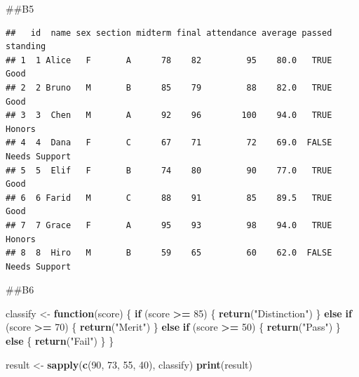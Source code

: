 \documentclass[
]{article}
\newenvironment{Shaded}{\begin{snugshade}}{\end{snugshade}}
\newcommand{\ControlFlowTok}[1]{\textcolor[rgb]{0.13,0.29,0.53}{\textbf{#1}}}
\newcommand{\DecValTok}[1]{\textcolor[rgb]{0.00,0.00,0.81}{#1}}
\newcommand{\FunctionTok}[1]{\textcolor[rgb]{0.13,0.29,0.53}{\textbf{#1}}}
\newcommand{\NormalTok}[1]{#1}
\newcommand{\OtherTok}[1]{\textcolor[rgb]{0.56,0.35,0.01}{#1}}
\newcommand{\SpecialCharTok}[1]{\textcolor[rgb]{0.81,0.36,0.00}{\textbf{#1}}}
\newcommand{\StringTok}[1]{\textcolor[rgb]{0.31,0.60,0.02}{#1}}
\begin{document}
\#\#B5

\begin{Shaded}
\end{Shaded}

\begin{verbatim}
##   id  name sex section midterm final attendance average passed      standing
## 1  1 Alice   F       A      78    82         95    80.0   TRUE          Good
## 2  2 Bruno   M       B      85    79         88    82.0   TRUE          Good
## 3  3  Chen   M       A      92    96        100    94.0   TRUE        Honors
## 4  4  Dana   F       C      67    71         72    69.0  FALSE Needs Support
## 5  5  Elif   F       B      74    80         90    77.0   TRUE          Good
## 6  6 Farid   M       C      88    91         85    89.5   TRUE          Good
## 7  7 Grace   F       A      95    93         98    94.0   TRUE        Honors
## 8  8  Hiro   M       B      59    65         60    62.0  FALSE Needs Support
\end{verbatim}

\#\#B6

\begin{Shaded}
\begin{Highlighting}[]
\NormalTok{classify }\OtherTok{\textless{}{-}} \ControlFlowTok{function}\NormalTok{(score) \{}
  \ControlFlowTok{if}\NormalTok{ (score }\SpecialCharTok{\textgreater{}=} \DecValTok{85}\NormalTok{) \{}
    \FunctionTok{return}\NormalTok{(}\StringTok{"Distinction"}\NormalTok{)}
\NormalTok{  \} }\ControlFlowTok{else} \ControlFlowTok{if}\NormalTok{ (score }\SpecialCharTok{\textgreater{}=} \DecValTok{70}\NormalTok{) \{}
    \FunctionTok{return}\NormalTok{(}\StringTok{"Merit"}\NormalTok{)}
\NormalTok{  \} }\ControlFlowTok{else} \ControlFlowTok{if}\NormalTok{ (score }\SpecialCharTok{\textgreater{}=} \DecValTok{50}\NormalTok{) \{}
    \FunctionTok{return}\NormalTok{(}\StringTok{"Pass"}\NormalTok{)}
\NormalTok{  \} }\ControlFlowTok{else}\NormalTok{ \{}
    \FunctionTok{return}\NormalTok{(}\StringTok{"Fail"}\NormalTok{)}
\NormalTok{  \}}
\NormalTok{\}}

\NormalTok{result }\OtherTok{\textless{}{-}} \FunctionTok{sapply}\NormalTok{(}\FunctionTok{c}\NormalTok{(}\DecValTok{90}\NormalTok{, }\DecValTok{73}\NormalTok{, }\DecValTok{55}\NormalTok{, }\DecValTok{40}\NormalTok{), classify)}
\FunctionTok{print}\NormalTok{(result)}
\end{Highlighting}
\end{Shaded}
\end{document}
